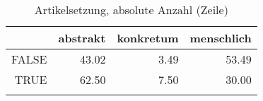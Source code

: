\begin{table}[ht]
\centering
\begin{tabular}{rrrr}
  \lsptoprule
 & abstrakt & konkretum & menschlich \\ 
  \midrule
FALSE & 43.02 & 3.49 & 53.49 \\ 
  TRUE & 62.50 & 7.50 & 30.00 \\ 
   \lspbottomrule
\end{tabular}
\caption{Artikelsetzung, absolute Anzahl (Zeile)} 
\end{table}
